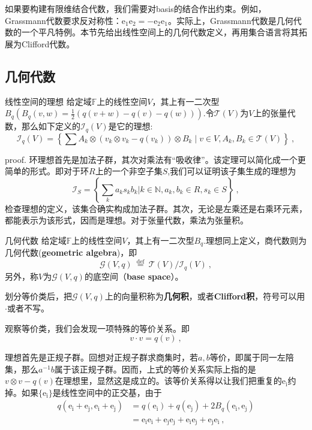 


如果要构建有限维结合代数，我们需要对basis的结合作出约束。例如，Grassmann代数要求反对称性：$\mathrm {e_1e_2}=-\mathrm {e_2e_1}$。实际上，Grassmann代数是几何代数的一个平凡特例。本节先给出线性空间上的几何代数定义，再用集合语言将其拓展为Clifford代数。
\subsection{几何代数}
\begin{theorem}{线性空间的理想}
给定域$\mathbb F$上的线性空间$V$，其上有一二次型$B_q(B_q(v,w)=\frac{1}{2}(q(v+w)-q(v)-q(w)))$.令$\mathcal T(V)$为$V$上的张量代数，那么如下定义的$\mathcal {I}_q(V)$是它的理想:
\begin{equation}
\mathcal{I}_{q}(V)=\left\{\sum A_{k} \otimes(v_k \otimes v_k-q(v_k)) \otimes B_{k} \mid v \in V, A_{k}, B_{k} \in \mathcal{T}(V)\right\}~,
\end{equation}
\end{theorem}
proof.
环理想首先是加法子群，其次对乘法有“吸收律”。该定理可以简化成一个更简单的形式。即对于环$R$上的一个非空子集$S$,我们可以证明该子集生成的理想为
\begin{equation}
\mathcal {I}_S=\left\{\sum _k a_k s_kb_k|k\in \mathbb N ,a_k,b_k\in R,s_k\in S\right\}~,
\end{equation}
检查理想的定义，该集合确实构成加法子群。其次，无论是左乘还是右乘环元素，都能表示为该形式，因而是理想。对于张量代数，乘法为张量积。

\begin{definition}{几何代数}
给定域$\mathbb F$上的线性空间$V$，其上有一二次型$B_q$.理想同上定义，商代数则为几何代数(\textbf{geometric algebra})，即
\begin{equation}
\mathcal{G}(V, q) \stackrel{\text { def }}{=} \mathcal{T}(V) / \mathcal{I}_{q}(V)~,
\end{equation}
另外，称$V$为$\mathcal{G}(V, q)$的底空间（\textbf{base space}）。
\end{definition}
划分等价类后，把$\mathcal{G}(V, q)$上的向量积称为\textbf{几何积}，或者\textbf{Clifford积}，符号可以用$\cdot$或者不写。

观察等价类，我们会发现一项特殊的等价关系。即
\begin{equation}
v\cdot v=q(v)~,
\end{equation}

理想首先是正规子群。回想对正规子群求商集时，若$a,b$等价，即属于同一左陪集，那么$a^{-1}b$属于该正规子群。因而，上式的等价关系实际上指的是
$v \otimes v-q(v)$在理想里，显然这是成立的。该等价关系得以让我们把重复的$\mathrm {e_i}$约掉。如果$\{\mathrm{e_i}\}$是线性空间中的正交基，由于
\begin{equation}
\begin{aligned}
q(\mathrm{e_i+e_j,e_i+e_j})&=q(\mathrm{e_i})+q(\mathrm{e_j})+2 B_q(\mathrm{e_i,e_j})\\
&=\mathrm{e_ie_i+e_je_j+e_ie_j+e_je_i}~,
\end{aligned}
\end{equation}

